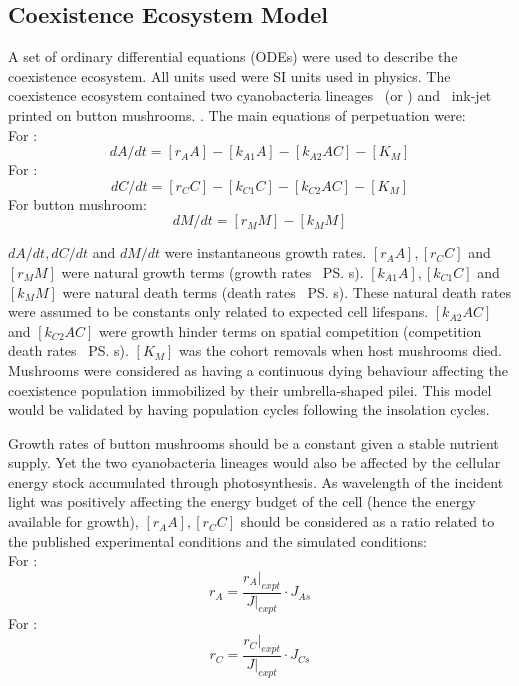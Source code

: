\documentclass[../thesis.tex]{subfiles} %
\begin{document}
\subsection{Coexistence Ecosystem Model}
A set of ordinary differential equations (ODEs) were used to describe the coexistence ecosystem.  All units used were SI units used in physics.  The coexistence ecosystem contained two cyanobacteria lineages \As\ (or \Ss) and \Cs\ ink-jet printed on button mushrooms.\autocite{joshi2018bacterial} . The main equations of perpetuation were:\\
For \As:
\begin{equation}
	dA/dt = [r_A A] - [k_{A1} A] - [k_{A2} A C] - [K_M]
\end{equation}
For \Cs:
\begin{equation}
	dC/dt = [r_C C] - [k_{C1} C] - [k_{C2} A C] - [K_M]
\end{equation}
For button mushroom:
\begin{equation}
	dM/dt = [r_M M] - [k_M M]
\end{equation}

$dA/dt, dC/dt$ and $dM/dt$ were instantaneous growth rates.  $[r_A A], [r_C C]$ and $[r_M M]$ were natural growth terms (growth rates \times\ \ps s).  $[k_{A1} A], [k_{C1} C]$ and $[k_M M]$ were natural death terms (death rates \times\ \ps s).  These natural death rates were assumed to be constants only related to expected cell lifespans.  $[k_{A2} A C]$ and $[k_{C2} A C]$ were growth hinder terms on spatial competition (competition death rates \times\ \ps s).  $[K_M]$ was the cohort removals when host mushrooms died.  Mushrooms were considered as having a continuous dying behaviour affecting the coexistence population immobilized by their umbrella-shaped pilei.  This model would be validated by having population cycles following the insolation cycles.

Growth rates of button mushrooms should be a constant given a stable nutrient supply.  Yet the two cyanobacteria lineages would also be affected by the cellular energy stock accumulated through photosynthesis.  As wavelength of the incident light was positively affecting the energy budget of the cell (hence the energy available for growth), $[r_A A], [r_C C]$ should be considered as a ratio related to the published experimental conditions and the simulated conditions:\\
For \As:
\begin{equation}
    r_A = \dfrac{r_A|_{expt}}{J|_{expt}}\cdot J_{As}
\end{equation}
For \Cs:
\begin{equation}
    r_C = \dfrac{r_C|_{expt}}{J|_{expt}}\cdot J_{Cs}
\end{equation}
\end{document}
